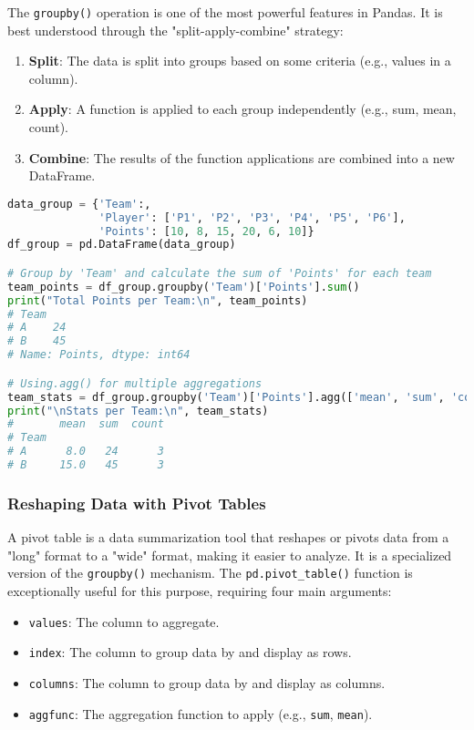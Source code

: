 \documentclass[11pt,a4paper]{article}
\begin{document}
The \texttt{groupby()} operation is one of the most powerful features in Pandas. It is best understood through the "split-apply-combine" strategy:
\begin{enumerate}
    \item \textbf{Split}: The data is split into groups based on some criteria (e.g., values in a column).
    \item \textbf{Apply}: A function is applied to each group independently (e.g., sum, mean, count).
    \item \textbf{Combine}: The results of the function applications are combined into a new DataFrame.
\end{enumerate}

\begin{lstlisting}[language=Python]
data_group = {'Team':,
              'Player': ['P1', 'P2', 'P3', 'P4', 'P5', 'P6'],
              'Points': [10, 8, 15, 20, 6, 10]}
df_group = pd.DataFrame(data_group)

# Group by 'Team' and calculate the sum of 'Points' for each team
team_points = df_group.groupby('Team')['Points'].sum()
print("Total Points per Team:\n", team_points)
# Team
# A    24
# B    45
# Name: Points, dtype: int64

# Using.agg() for multiple aggregations
team_stats = df_group.groupby('Team')['Points'].agg(['mean', 'sum', 'count'])
print("\nStats per Team:\n", team_stats)
#       mean  sum  count
# Team
# A      8.0   24      3
# B     15.0   45      3
\end{lstlisting}

\subsubsection{Reshaping Data with Pivot Tables}

A pivot table is a data summarization tool that reshapes or pivots data from a "long" format to a "wide" format, making it easier to analyze. It is a specialized version of the \texttt{groupby()} mechanism. The \texttt{pd.pivot\_table()} function is exceptionally useful for this purpose, requiring four main arguments:
\begin{itemize}
    \item \texttt{values}: The column to aggregate.
    \item \texttt{index}: The column to group data by and display as rows.
    \item \texttt{columns}: The column to group data by and display as columns.
    \item \texttt{aggfunc}: The aggregation function to apply (e.g., \texttt{sum}, \texttt{mean}).
\end{itemize}
\end{document}
